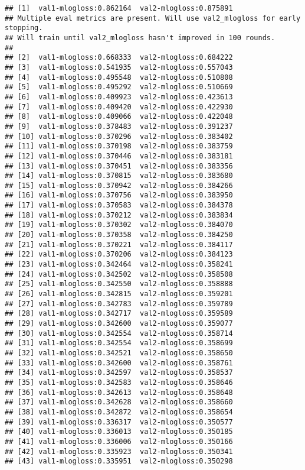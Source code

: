 \documentclass[]{article}
\begin{document}
\begin{verbatim}
## [1]  val1-mlogloss:0.862164  val2-mlogloss:0.875891 
## Multiple eval metrics are present. Will use val2_mlogloss for early stopping.
## Will train until val2_mlogloss hasn't improved in 100 rounds.
## 
## [2]  val1-mlogloss:0.668333  val2-mlogloss:0.684222 
## [3]  val1-mlogloss:0.541935  val2-mlogloss:0.557043 
## [4]  val1-mlogloss:0.495548  val2-mlogloss:0.510808 
## [5]  val1-mlogloss:0.495292  val2-mlogloss:0.510669 
## [6]  val1-mlogloss:0.409923  val2-mlogloss:0.423613 
## [7]  val1-mlogloss:0.409420  val2-mlogloss:0.422930 
## [8]  val1-mlogloss:0.409066  val2-mlogloss:0.422048 
## [9]  val1-mlogloss:0.378483  val2-mlogloss:0.391237 
## [10] val1-mlogloss:0.370296  val2-mlogloss:0.383402 
## [11] val1-mlogloss:0.370198  val2-mlogloss:0.383759 
## [12] val1-mlogloss:0.370446  val2-mlogloss:0.383181 
## [13] val1-mlogloss:0.370451  val2-mlogloss:0.383356 
## [14] val1-mlogloss:0.370815  val2-mlogloss:0.383680 
## [15] val1-mlogloss:0.370942  val2-mlogloss:0.384266 
## [16] val1-mlogloss:0.370756  val2-mlogloss:0.383950 
## [17] val1-mlogloss:0.370583  val2-mlogloss:0.384378 
## [18] val1-mlogloss:0.370212  val2-mlogloss:0.383834 
## [19] val1-mlogloss:0.370302  val2-mlogloss:0.384070 
## [20] val1-mlogloss:0.370358  val2-mlogloss:0.384250 
## [21] val1-mlogloss:0.370221  val2-mlogloss:0.384117 
## [22] val1-mlogloss:0.370206  val2-mlogloss:0.384123 
## [23] val1-mlogloss:0.342464  val2-mlogloss:0.358241 
## [24] val1-mlogloss:0.342502  val2-mlogloss:0.358508 
## [25] val1-mlogloss:0.342550  val2-mlogloss:0.358888 
## [26] val1-mlogloss:0.342815  val2-mlogloss:0.359201 
## [27] val1-mlogloss:0.342783  val2-mlogloss:0.359789 
## [28] val1-mlogloss:0.342717  val2-mlogloss:0.359589 
## [29] val1-mlogloss:0.342600  val2-mlogloss:0.359077 
## [30] val1-mlogloss:0.342554  val2-mlogloss:0.358714 
## [31] val1-mlogloss:0.342554  val2-mlogloss:0.358699 
## [32] val1-mlogloss:0.342521  val2-mlogloss:0.358650 
## [33] val1-mlogloss:0.342600  val2-mlogloss:0.358761 
## [34] val1-mlogloss:0.342597  val2-mlogloss:0.358537 
## [35] val1-mlogloss:0.342583  val2-mlogloss:0.358646 
## [36] val1-mlogloss:0.342613  val2-mlogloss:0.358648 
## [37] val1-mlogloss:0.342628  val2-mlogloss:0.358660 
## [38] val1-mlogloss:0.342872  val2-mlogloss:0.358654 
## [39] val1-mlogloss:0.336317  val2-mlogloss:0.350577 
## [40] val1-mlogloss:0.336013  val2-mlogloss:0.350185 
## [41] val1-mlogloss:0.336006  val2-mlogloss:0.350166 
## [42] val1-mlogloss:0.335923  val2-mlogloss:0.350341 
## [43] val1-mlogloss:0.335951  val2-mlogloss:0.350298 

\end{verbatim}
\end{document}
